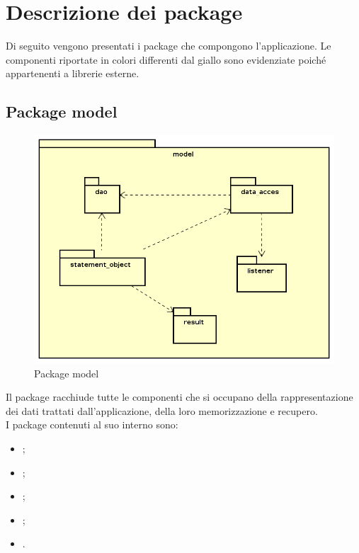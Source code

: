 \documentclass[../Tesi.tex]{subfiles}
\begin{document}
\section{Descrizione dei package}
Di seguito vengono presentati i package che compongono l'applicazione. Le componenti riportate in colori differenti dal giallo sono evidenziate poiché appartenenti a librerie esterne.

	\subsection{Package model}
		\begin{figure}[H]
			\centering
			\includegraphics[scale=0.6]{images/package_diagrams/model}
				\caption{Package model}
		\end{figure}
		Il package  racchiude tutte le componenti che si occupano della rappresentazione dei dati trattati dall'applicazione, della loro memorizzazione e recupero. \\
		I package contenuti al suo interno sono:
		\begin{itemize}
			\item {};
			\item {};
			\item {};
			\item {};
			\item {}.
		\end{itemize}
\end{document}
